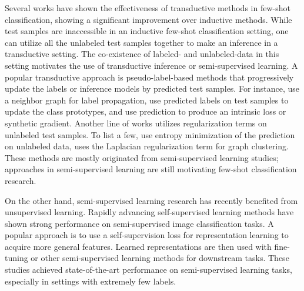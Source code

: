 \documentclass{article}
\begin{document}
Several works \cite{TPN, CAN, Team, SIB, transBaseline, LaplacianShot, TIM} have shown the effectiveness of transductive methods in few-shot classification, showing a significant improvement over inductive methods.
While test samples are inaccessible in an inductive few-shot classification setting, one can utilize all the unlabeled test samples together to make an inference in a transductive setting.
The co-existence of labeled- and unlabeled-data in this setting motivates the use of transductive inference or semi-supervised learning.
A popular transductive approach is pseudo-label-based methods that progressively update the labels or inference models by predicted test samples.
For instance, \citet{TPN, kim2019edge} use a neighbor graph for label propagation, \citet{CAN, BDCSPN} use predicted labels on test samples to update the class prototypes, and \citet{SCA, SIB} use prediction to produce an intrinsic loss or synthetic gradient.
Another line of works utilizes regularization terms on unlabeled test samples. 
To list a few, \citet{transBaseline, TIM} use entropy minimization of the prediction on unlabeled data, \citet{LaplacianShot} uses the Laplacian regularization term for graph clustering.
These methods are mostly originated from semi-supervised learning studies; approaches in semi-supervised learning are still motivating few-shot classification research.

On the other hand, semi-supervised learning research has recently benefited from unsupervised learning.
Rapidly advancing self-supervised learning methods \cite{caron2021unsupervised, grill2020bootstrap, chen2020big} have shown strong performance on semi-supervised image classification tasks.
A popular approach is to use a self-supervision loss for representation learning to acquire more general features.
Learned representations are then used with fine-tuning \cite{caron2021unsupervised, grill2020bootstrap, chen2020big} or other semi-supervised learning methods \cite{zhai2019s4l, kim2021selfmatch} for downstream tasks.
These studies achieved state-of-the-art performance on semi-supervised learning tasks, especially in settings with extremely few labels.
\end{document}
